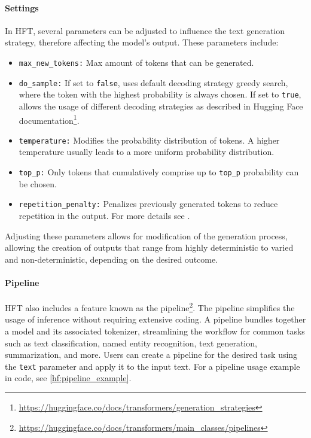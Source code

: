 \documentclass[english, ba, kiv, he, iso690numb, pdf, viewonly]{fasthesis}
\begin{document}
\paragraph{Settings}\label{impl:hf:inference_settings}
In HFT, several parameters can be adjusted to influence the text generation strategy, therefore affecting the model's output. These parameters include:
\begin{itemize}
    \item \texttt{max\_new\_tokens:} Max amount of tokens that can be generated.
    \item \texttt{do\_sample:} If set to \texttt{false}, uses default decoding strategy greedy search, where the token with the highest probability is always chosen. If set to \texttt{true}, allows the usage of different decoding strategies as described in Hugging Face documentation\footnote{\url{https://huggingface.co/docs/transformers/generation_strategies}}.
    \item \texttt{temperature:} Modifies the probability distribution of tokens. A higher temperature usually leads to a more uniform probability distribution.
    \item \texttt{top\_p:} Only tokens that cumulatively comprise up to \texttt{top\_p} probability can be chosen.
    \item \texttt{repetition\_penalty:} Penalizes previously generated tokens to reduce repetition in the output. For more details see \cite{keskar2019ctrl}.
\end{itemize}
Adjusting these parameters allows for modification of the generation process, allowing the creation of outputs that range from highly deterministic to varied and non-deterministic, depending on the desired outcome.

\paragraph{Pipeline} \label{hf:pipeline}
HFT also includes a feature known as the pipeline\footnote{\url{https://huggingface.co/docs/transformers/main_classes/pipelines}}. The pipeline simplifies the usage of inference without requiring extensive coding. A pipeline bundles together a model and its associated tokenizer, streamlining the workflow for common tasks such as text classification, named entity recognition, text generation, summarization, and more. Users can create a pipeline for the desired task using the \texttt{text} parameter and apply it to the input text. For a pipeline usage example in code, see \ref{hf:pipeline_example}.
\end{document}
